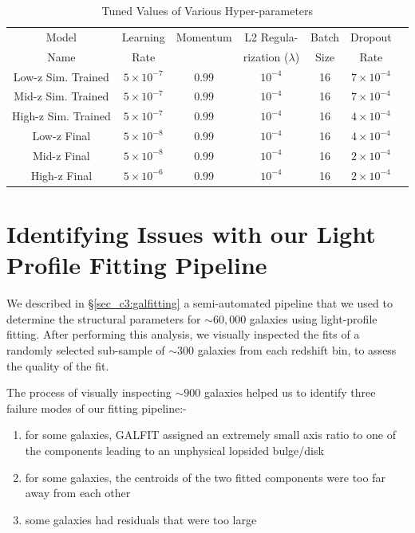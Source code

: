 \begin{table}[htbp]
\centering
\caption{Tuned Values of Various Hyper-parameters  \label{tab_c3:hyper_para}}
\begin{tabular}{c|cccccc}
\hline
\hline
Model& Learning & Momentum & L2 Regula- & Batch & Dropout\\
Name & Rate & & rization ($\lambda$) & Size & Rate\\
\hline
    \hline
    Low-z Sim. Trained & $5\times10^{-7}$ & 0.99 & $10^{-4}$ & 16 & $7\times10^{-4}$\\
    Mid-z Sim. Trained & $5\times10^{-7}$ & 0.99 & $10^{-4}$ & 16 & $7\times10^{-4}$\\
    High-z Sim. Trained & $5\times10^{-7}$ & 0.99 & $10^{-4}$ & 16 & $4\times10^{-4}$\\
    \hline
    Low-z Final & $5\times10^{-8}$ & 0.99 & $10^{-4}$ & 16 & $4\times10^{-4}$\\
    Mid-z Final & $5\times10^{-8}$ & 0.99 & $10^{-4}$ & 16 & $2\times10^{-4}$\\
    High-z Final & $5\times10^{-6}$ & 0.99 & $10^{-4}$ & 16 & $2\times10^{-4}$\\
\hline
\end{tabular}
\end{table}


\section{Identifying Issues with our Light Profile Fitting Pipeline}\label{ap:sec_c3:galfit_failures}

We described in \S \ref{sec_c3:galfitting} a semi-automated pipeline that we used to determine the structural parameters for $\sim60,000$ galaxies using light-profile fitting. After performing this analysis, we visually inspected the fits of a randomly selected sub-sample of $\sim300$ galaxies from each redshift bin, to assess the quality of the fit. 

The process of visually inspecting $\sim 900$ galaxies helped us to identify three failure modes of our fitting pipeline:-

\begin{enumerate}
    \item for some galaxies, GALFIT assigned an extremely small axis ratio to one of the components leading to an unphysical lopsided bulge/disk
    \item for some galaxies, the centroids of the two fitted components were too far away from each other
    \item some galaxies had residuals that were too large
\end{enumerate}

